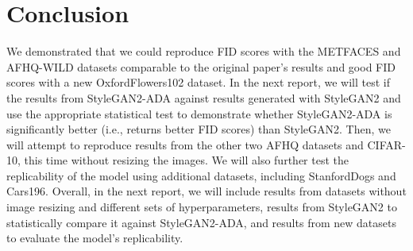 \documentclass{report}
\begin{document}
\section{Conclusion}

We demonstrated that we could reproduce FID scores with the METFACES and AFHQ-WILD datasets comparable to the original paper's results and good FID scores with a new OxfordFlowers102 dataset. In the next report, we will test if the results from StyleGAN2-ADA against results generated with StyleGAN2 and use the appropriate statistical test to demonstrate whether StyleGAN2-ADA is significantly better (i.e., returns better FID scores) than StyleGAN2. Then, we will attempt to reproduce results from the other two AFHQ datasets and CIFAR-10, this time without resizing the images. We will also further test the replicability of the model using additional datasets, including StanfordDogs and Cars196. Overall, in the next report, we will include results from datasets without image resizing and different sets of hyperparameters, results from StyleGAN2 to statistically compare it against StyleGAN2-ADA, and results from new datasets to evaluate the model's replicability.

\end{document}
